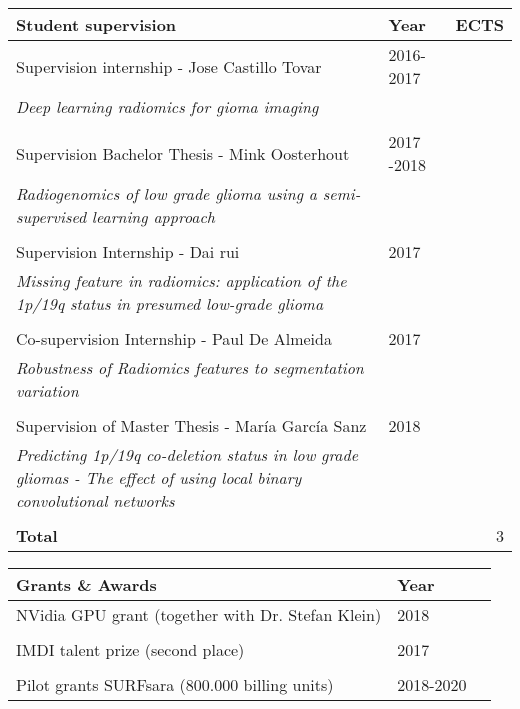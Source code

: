 \vspace*{0.5cm}
\begin{tabular}{L{8cm}lr}
    \textbf{Student supervision}&\textbf{Year}&\textbf{ECTS}\\
    \toprule
    Supervision internship - Jose Castillo Tovar & 2016-2017 \\
    \textit{Deep learning radiomics for gioma imaging}\\
    \\
    Supervision Bachelor Thesis - Mink Oosterhout & 2017 -2018\\
    \textit{Radiogenomics of low grade glioma using a semi-supervised learning approach}\\
    \\
    Supervision Internship - Dai rui & 2017\\
    \textit{Missing feature in radiomics: application of the 1p/19q status in presumed low-grade glioma}\\
    \\
    Co-supervision Internship - Paul De Almeida & 2017\\
    \textit{Robustness of Radiomics features to segmentation variation}\\
    \\
    Supervision of Master Thesis - Mar{\'i}a Garc{\'i}a Sanz & 2018\\
    \textit{Predicting 1p/19q co-deletion status in low grade gliomas - The effect of using local binary convolutional networks}\\
    \\
    \textbf{Total} & & 3\\
\end{tabular}


\newpage
\begin{tabular}{L{8cm}lr}
    \textbf{Grants \& Awards}&\textbf{Year}\\
    \toprule
    NVidia GPU grant (together with Dr. Stefan Klein) & 2018\\
    \\
    IMDI talent prize (second place) & 2017\\
    \\
    Pilot grants SURFsara (800.000 billing units) & 2018-2020\\
\end{tabular}

